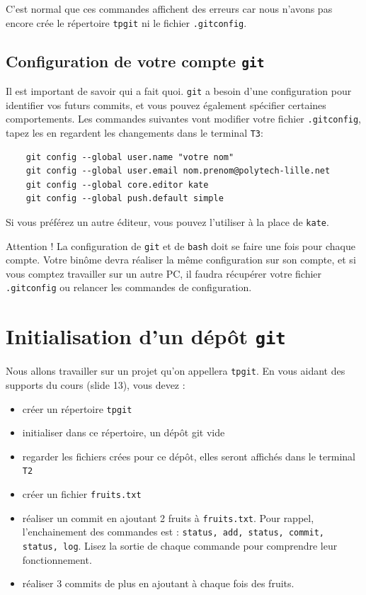 \documentclass[final, a4paper, openbib, ]{article}
\begin{document}
C'est normal que ces commandes affichent des erreurs car nous n'avons pas encore crée le répertoire \texttt{tpgit} ni le fichier \texttt{.gitconfig}.


\subsection{Configuration de votre compte \texttt{git}}

Il est important de savoir qui a fait quoi. \texttt{git} a besoin d'une configuration pour identifier vos futurs commits, et vous pouvez également spécifier certaines comportements.
Les commandes suivantes vont modifier votre fichier \texttt{.gitconfig}, tapez les en regardent les changements dans le terminal \texttt{T3}:

\begin{verbatim}
	git config --global user.name "votre nom"
	git config --global user.email nom.prenom@polytech-lille.net
	git config --global core.editor kate
	git config --global push.default simple
\end{verbatim}

Si vous préférez un autre éditeur, vous pouvez l'utiliser à la place de \texttt{kate}.

\begin{alertinfo}{Attention !}
La configuration de \texttt{git} et de \texttt{bash} doit se faire une fois pour chaque compte.
Votre binôme devra réaliser la même configuration sur son compte, et si vous comptez travailler sur un autre PC, il faudra récupérer votre fichier \texttt{.gitconfig} ou relancer les commandes de configuration.
\end{alertinfo}

\section{Initialisation d'un dépôt \texttt{git}}

Nous allons travailler sur un projet qu'on appellera \texttt{tpgit}. En vous aidant des supports du cours (slide 13), vous devez :
\begin{itemize}
\item créer un répertoire \texttt{tpgit}
\item initialiser dans ce répertoire, un dépôt git vide
\item regarder les fichiers crées pour ce dépôt, elles seront affichés dans le terminal \texttt{T2}
\item créer un fichier \texttt{fruits.txt}
\item réaliser un commit en ajoutant 2 fruits à \texttt{fruits.txt}. Pour rappel, l'enchainement des commandes est : \texttt{status, add, status, commit, status, log}.
Lisez la sortie de chaque commande pour comprendre leur fonctionnement.
\item réaliser 3 commits de plus en ajoutant à chaque fois des fruits.
\end{itemize}
\end{document}
